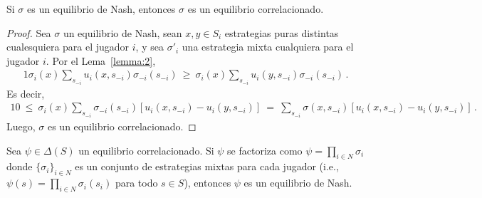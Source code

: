 \begin{theorem}
\label{theo:nash-correlacionado}
Si $\sigma$ es un equilibrio de Nash, entonces $\sigma$ es un equilibrio correlacionado.
\end{theorem}
\begin{proof}
Sea $\sigma$ un equilibrio de Nash, sean $x,y\in S_i$ estrategias puras distintas cualesquiera para el jugador $i$, y sea $\sigma'_i$ una estrategia mixta cualquiera para el jugador $i$. Por el Lema~\ref{lemma:2},
\begin{alignat}{1}
  \sigma_i(x) \sum_{s_{-i}} u_i(x,s_{-i}) \sigma_{-i}(s_{-i})\ \geq\  \sigma_i(x)\sum_{s_{-i}} u_i(y,s_{-i}) \sigma_{-i}(s_{-i}) \,.
\end{alignat}
Es decir,
\begin{alignat}{1}
  0\ \leq\ \sigma_i(x) \sum_{s_{-i}} \sigma_{-i}(s_{-i}) [u_i(x,s_{-i}) - u_i(y,s_{-i})]\ =\ \sum_{s_{-i}} \sigma(x,s_{-i}) [u_i(x,s_{-i}) - u_i(y,s_{-i})] \,.
\end{alignat}
Luego, $\sigma$ es un equilibrio correlacionado.
\end{proof}

\begin{theorem}
\label{theo:correlacionado-nash}
Sea $\psi\in\Delta(S)$ un equilibrio correlacionado. Si $\psi$ se factoriza como $\psi=\prod_{i\in N} \sigma_i$ donde $\{\sigma_i\}_{i\in N}$ es un conjunto de estrategias mixtas para cada jugador (i.e., $\psi(s)=\prod_{i \in N} \sigma_i(s_i)$ para todo $s\in S$), entonces $\psi$ es un equilibrio de Nash.
\end{theorem}

